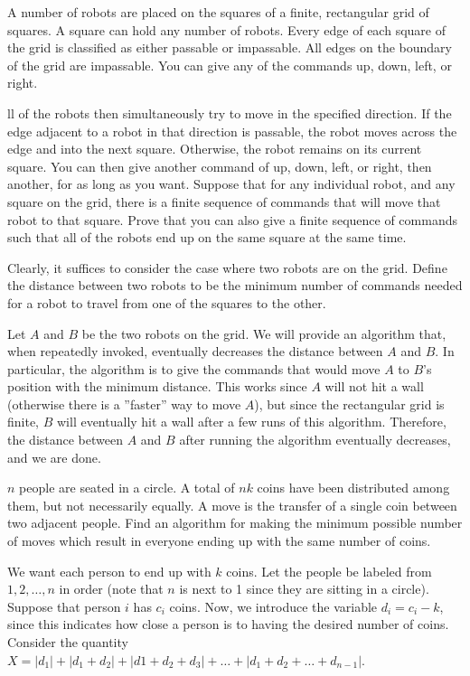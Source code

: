 \begin{example}[Canada 2014]
    A number of robots are placed on the squares of a finite, rectangular grid of squares. A square can hold any number of robots. Every edge of each square of the grid is classified as either passable or impassable. All edges on the boundary of the grid are impassable. You can give any of the commands up, down, left, or right.

    ll of the robots then simultaneously try to move in the specified direction. If the edge adjacent to a robot in that direction is passable, the robot moves across the edge and into the next square. Otherwise, the robot remains on its current square. You can then give another command of up, down, left, or right, then another, for as long as you want. Suppose that for any individual robot, and any square on the grid, there is a finite sequence of commands that will move that robot to that square. Prove that you can also give a finite sequence of commands such that all of the robots end up on the same square at the same time.
\end{example}

\sol Clearly, it suffices to consider the case where two robots are on the grid. Define the distance between two robots to be the minimum number of commands needed for a robot to travel from one of the squares to the other.

Let $A$ and $B$ be the two robots on the grid. We will provide an algorithm that, when repeatedly invoked, eventually decreases the distance between $A$ and $B$. In particular, the algorithm is to give the commands that would move $A$ to $B$'s position with the minimum distance. This works since $A$ will not hit a wall (otherwise there is a ''faster'' way to move $A$), but since the rectangular grid is finite, $B$ will eventually hit a wall after a few runs of this algorithm. Therefore, the distance between $A$ and $B$ after running the algorithm eventually decreases, and we are done.

\begin{example} [APMO 1997]
    $n$ people are seated in a circle. A total of $nk$ coins have been distributed among them, but not necessarily equally. A move is the transfer of a single coin between two adjacent people. Find an algorithm for making the minimum possible number of moves which result in everyone ending up with the same number of coins. 
\end{example}

\sol We want each person to end up with $k$ coins. Let the people be labeled from $1, 2, \dots, n$ in order (note that $n$ is next to 1 since they are sitting in a circle). Suppose that person $i$ has $c_i$ coins. Now, we introduce the variable $d_i = c_i - k$, since this indicates how close a person is to having the desired number of coins. Consider the quantity $X = |d_1| + |d_1 + d_2| + |d1 + d_2 + d_3| + \dots + |d_1 + d_2 + \dots + d_{n-1}|$.

